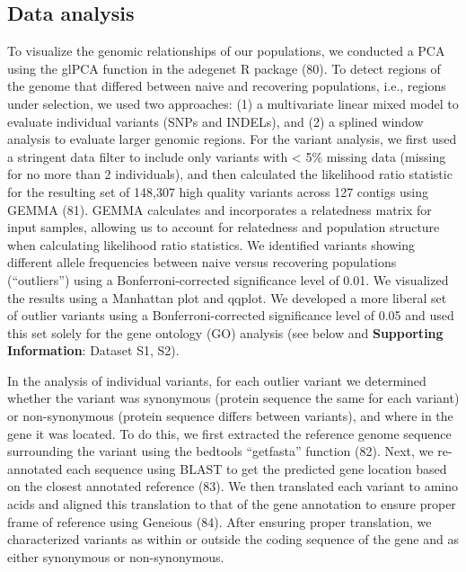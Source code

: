 \documentclass[9pt,twocolumn,twoside,lineno]{pnas-new}
\begin{document}
{\hypertarget{data-analysis}{%
\subsection*{Data analysis}\label{data-analysis}}

To visualize the genomic relationships of our populations, we conducted
a PCA using the glPCA function in the adegenet R package (80). To detect
regions of the genome that differed between naive and recovering
populations, i.e., regions under selection, we used two approaches: (1)
a multivariate linear mixed model to evaluate individual variants (SNPs
and INDELs), and (2) a splined window analysis to evaluate larger
genomic regions. For the variant analysis, we first used a stringent
data filter to include only variants with \textless{} 5\% missing data
(missing for no more than 2 individuals), and then calculated the
likelihood ratio statistic for the resulting set of 148,307 high quality
variants across 127 contigs using GEMMA (81). GEMMA calculates and
incorporates a relatedness matrix for input samples, allowing us to
account for relatedness and population structure when calculating
likelihood ratio statistics. We identified variants showing different
allele frequencies between naive versus recovering populations
(``outliers'') using a Bonferroni-corrected significance level of 0.01.
We visualized the results using a Manhattan plot and qqplot. We
developed a more liberal set of outlier variants using a
Bonferroni-corrected significance level of 0.05 and used this set solely
for the gene ontology (GO) analysis (see below and \textbf{Supporting
Information}: Dataset S1, S2).

In the analysis of individual variants, for each outlier variant we
determined whether the variant was synonymous (protein sequence the same
for each variant) or non-synonymous (protein sequence differs between
variants), and where in the gene it was located. To do this, we first
extracted the reference genome sequence surrounding the variant using
the bedtools ``getfasta'' function (82). Next, we re-annotated each
sequence using BLAST to get the predicted gene location based on the
closest annotated reference (83). We then translated each variant to
amino acids and aligned this translation to that of the gene annotation
to ensure proper frame of reference using Geneious (84). After ensuring
proper translation, we characterized variants as within or outside the
coding sequence of the gene and as either synonymous or non-synonymous.

}
\end{document}
